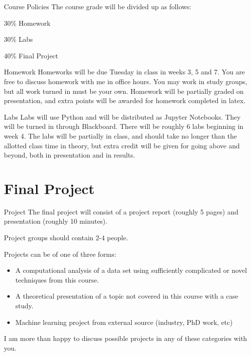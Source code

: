 \documentclass[10pt, handout]{beamer}
\begin{document}
\begin{frame}[fragile]{Course Policies}
The course grade will be divided up as follows:

30\% Homework

30\% Labs

40\% Final Project
\end{frame}



\begin{frame}[fragile]{Homework}
Homeworks will be due Tuesday in class in weeks 3, 5 and 7. You are free to discuss homework with me in office hours. You may work in study groups, but all work turned in must be your own. Homework will be partially graded on presentation, and extra points will be awarded for homework completed in latex. 
\end{frame}




\begin{frame}[fragile]{Labs}
Labs will use Python and will be distributed as Jupyter Notebooks. They will be turned in through Blackboard. There will be roughly 6 labs beginning in week 4. The labs will be partially in class, and should take no longer than the allotted class time in theory, but extra credit will be given for going above and beyond, both in presentation and in results. 
\end{frame}




\section{Final Project}

\begin{frame}[fragile]{Project}
The final project will consist of a project report (roughly 5 pages) and presentation (roughly 10 minutes). \pause

Project groups should contain 2-4 people.\pause

Projects can be of one of three forms: \pause
\begin{itemize}
\item A computational analysis of a data set using sufficiently complicated or novel techniques from this course.
\item A theoretical presentation of a topic not covered in this course with a case study.
\item Machine learning project from external source (industry, PhD work, etc)
\end{itemize}
I am more than happy to discuss possible projects in any of these categories with you.
\end{frame}
\end{document}
